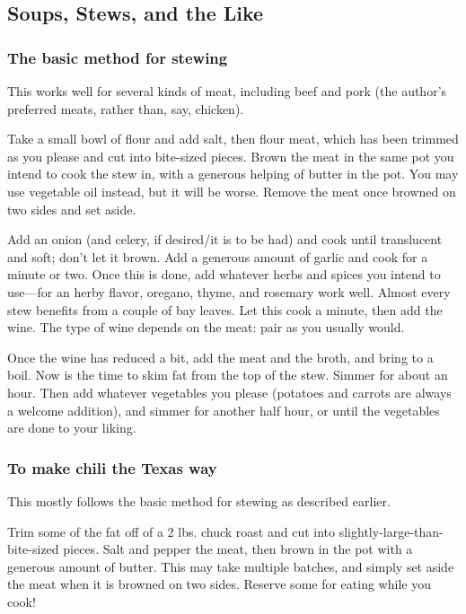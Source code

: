 \documentclass[10pt]{article}
\begin{document}
\subsection*{Soups, Stews, and the Like}

\subsubsection*{The basic method for stewing}

This works well for several kinds of meat, including beef and pork (the author's preferred meats, rather than, say, chicken).

Take a small bowl of flour and add salt, then flour meat, which has been trimmed as you please and cut into bite-sized pieces.
Brown the meat in the same pot you intend to cook the stew in, with a generous helping of butter in the pot.
You may use vegetable oil instead, but it will be worse.
Remove the meat once browned on two sides and set aside.

Add an onion (and celery, if desired/it is to be had) and cook until translucent and soft; don't let it brown.
Add a generous amount of garlic and cook for a minute or two.
Once this is done, add whatever herbs and spices you intend to use---for an herby flavor, oregano, thyme, and rosemary work well.
Almost every stew benefits from a couple of bay leaves.
Let this cook a minute, then add the wine.
The type of wine depends on the meat: pair as you usually would.

Once the wine has reduced a bit, add the meat and the broth, and bring to a boil.
Now is the time to skim fat from the top of the stew.
Simmer for about an hour.
Then add whatever vegetables you please (potatoes and carrots are always a welcome addition), and simmer for another half hour, or until the vegetables are done to your liking.

\subsubsection*{To make chili the Texas way}

This mostly follows the basic method for stewing as described earlier.

Trim some of the fat off of a 2 lbs. chuck roast and cut into slightly-large-than-bite-sized pieces.
Salt and pepper the meat, then brown in the pot with a generous amount of butter.
This may take multiple batches, and simply set aside the meat when it is browned on two sides.
Reserve some for eating while you cook!
\end{document}
